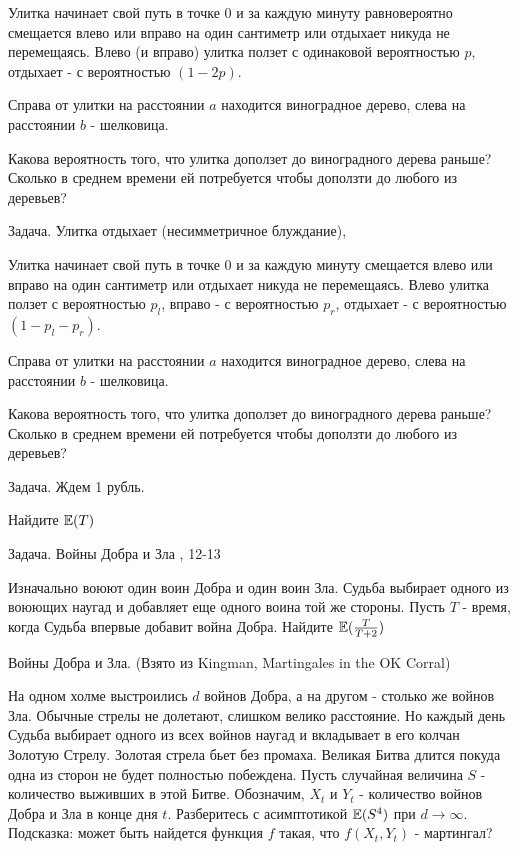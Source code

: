 {Улитка начинает свой путь в точке 0 и за каждую минуту равновероятно смещается влево или вправо на один сантиметр или отдыхает никуда не перемещаясь. Влево (и вправо) улитка ползет с одинаковой вероятностью $p$, отдыхает - с вероятностью $(1-2p)$. 

Справа от улитки на расстоянии $a$ находится виноградное дерево, слева на расстоянии $b$ - шелковица.

Какова вероятность того, что улитка доползет до виноградного дерева раньше? Сколько в среднем времени ей потребуется чтобы доползти до любого из деревьев?



Задача. Улитка отдыхает (несимметричное блуждание), \cite{blom:pspt}

Улитка начинает свой путь в точке 0 и за каждую минуту смещается влево или вправо на один сантиметр или отдыхает никуда не перемещаясь. Влево улитка ползет с вероятностью $p_{l}$, вправо - с вероятностью $p_{r}$, отдыхает - с вероятностью $(1-p_{l}-p_{r})$. 

Справа от улитки на расстоянии $a$ находится виноградное дерево, слева на расстоянии $b$ - шелковица.

Какова вероятность того, что улитка доползет до виноградного дерева раньше? Сколько в среднем времени ей потребуется чтобы доползти до любого из деревьев?

Задача. Ждем 1 рубль. 

Найдите $\mathbb{E}(T)$


Задача. Войны Добра и Зла \cite{stirzaker:otep}, 12-13

Изначально воюют один воин Добра и один воин Зла. Судьба выбирает одного из воюющих наугад и добавляет еще одного воина той же стороны. Пусть $T$ - время, когда Судьба впервые добавит война Добра. Найдите $\mathbb{E}(\frac{T}{T+2})$


Войны Добра и Зла. (Взято из  Kingman, Martingales in the OK Corral)

На одном холме выстроились $d$ войнов Добра, а на другом - столько же войнов Зла. Обычные стрелы не долетают, слишком велико расстояние. Но каждый день Судьба выбирает одного из всех войнов наугад и вкладывает в его колчан Золотую Стрелу. Золотая стрела бьет без промаха. Великая Битва длится покуда одна из сторон не будет полностью побеждена. Пусть случайная величина $S$ - количество выживших в этой Битве. Обозначим, $X_{t}$ и $Y_{t}$ - количество войнов Добра и Зла в конце дня $t$.  Разберитесь с асимптотикой $\mathbb{E}(S^{4})$ при $d\to\infty$. Подсказка: может быть найдется функция $f$ такая, что $f(X_{t},Y_{t})$ - мартингал?

}
